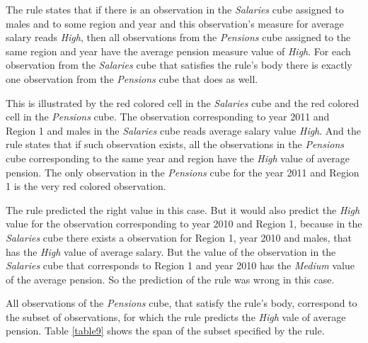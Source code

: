 The rule states that if there is an observation in the \textit{Salaries} cube assigned to males and to some region and year and this observation's measure for average salary reads \textit{High}, then all observations from the \textit{Pensions} cube assigned to the same region and year have the average pension measure value of \textit{High}. For each observation from the \textit{Salaries} cube that satisfies the rule's body there is exactly one observation from the \textit{Pensions} cube that does as well. 

This is illustrated by the red colored cell in the \textit{Salaries} cube and the red colored cell in the \textit{Pensions} cube. The observation corresponding to year 2011 and Region 1 and males in the \textit{Salaries} cube reads average salary value \textit{High}. And the rule states that if such observation exists, all the observations in the \textit{Pensions} cube corresponding to the same year and region have the \textit{High} value of average pension. The only observation in the \textit{Pensions} cube for the year 2011 and Region 1 is the very red colored observation. 

The rule predicted the right value in this case. But it would also predict the \textit{High} value for the observation corresponding to year 2010 and Region 1, because in the \textit{Salaries} cube there exists a observation for Region 1, year 2010 and males, that has the \textit{High} value of average salary. But the value of the observation in the \textit{Salaries} cube that corresponds to Region 1 and year 2010 has the \textit{Medium} value of the average pension. So the prediction of the rule was wrong in this case.

All observations of the \textit{Pensions} cube, that satisfy the rule's body, correspond to the subset of observations, for which the rule predicts the \textit{High} vale of average pension. Table \ref{table9} shows the span of the subset specified by the rule.

